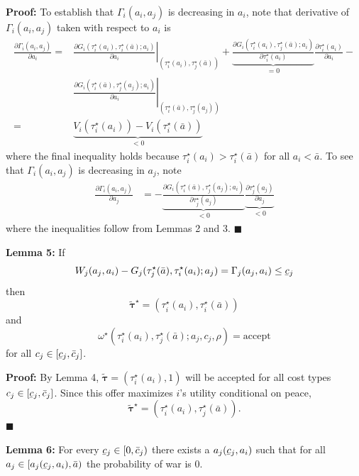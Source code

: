 \documentclass{puthesis}
\DeclareRobustCommand{\ubar}[1]{\underaccent{\bar}{#1}}
\begin{document}
\textbf{Proof: } To establish that \(\Gamma_i(a_i, a_j)\) is decreasing
in \(a_i\), note that derivative of \(\Gamma_i(a_i, a_j)\) taken with
respect to \(a_i\) is \begin{align*}
\frac{\partial \Gamma_i(a_i, a_j)}{\partial a_i} =& \left. \frac{\partial G_i(\tau_i^\star(a_i), \tau_i^\star(\bar{a}); a_i)}{\partial a_i} \right|_{\left( \tau_i^\star(a_i), \tau_j^\star(\bar{a}) \right)} + \underbrace{\frac{\partial G_i(\tau_i^\star(a_i), \tau_j^\star(\bar{a}); a_i)}{\partial \tau_i^\star(a_i)}}_{=0} \frac{\partial \tau_i^\star(a_i)}{\partial a_i} - \\
& \left. \frac{\partial G_i(\tau_i^\star(\bar{a}), \tau_j^\star(a_j); a_i)}{\partial a_i} \right|_{\left( \tau_i^\star(\bar{a}), \tau_j^\star(a_j) \right)} \\
=& \underbrace{V_i(\tau_i^\star(a_i)) - V_i(\tau_i^\star(\bar{a}))}_{<0}
\end{align*} where the final inequality holds because
\(\tau_i^\star(a_i) > \tau_i^\star(\bar{a})\) for all \(a_i < \bar{a}\).
To see that \(\Gamma_i(a_i, a_j)\) is decreasing in \(a_j\), note
\begin{align*}
\frac{\partial \Gamma_i(a_i, a_j)}{\partial a_j} &= - \underbrace{\frac{\partial G_i(\tau_i^\star(\bar{a}), \tau_j^\star(a_j); a_i)}{\partial \tau_j^\star(a_j)}}_{<0} \underbrace{\frac{\partial \tau_j^\star(a_j)}{\partial a_j}}_{<0}
\end{align*} where the inequalities follow from Lemmas 2 and 3.
\(\blacksquare\)

\textbf{Lemma 5:} If \[
W_j(a_j, a_i) - G_j(\tau_j^\star(\bar{a}), \tau_i^\star(a_i); a_j) = \Gamma_j(a_j, a_i) \leq \ubar{c}_j
\] then \[
\tilde{\bm{\tau}}^\star = \left( \tau_i^\star(a_i), \tau_i^\star(\bar{a}) \right)
\] and \[
\omega^\star(\tau_i^\star(a_i), \tau_j^\star(\bar{a}); a_j, c_j, \rho) = \text{accept}
\] for all \(c_j \in [\ubar{c}_j, \bar{c}_j]\).

\textbf{Proof:} By Lemma 4,
\(\tilde{\bm{\tau}} = \left( \tau_i^\star(a_i), 1 \right)\) will be
accepted for all cost types
\(c_j \in \left[ \ubar{c}_j, \bar{c}_j \right]\). Since this offer
maximizes \(i\)'s utility conditional on peace, \[
\tilde{\bm{\tau}}^\star = \left( \tau_i^\star(a_i), \tau_j^\star(\bar{a}) \right) .
\] \(\blacksquare\)

\textbf{Lemma 6:} For every \(\ubar{c}_j \in [ 0, \bar{c}_j )\) there
exists a \(a_j(\ubar{c}_j, a_i)\) such that for all
\(a_j \in [ a_j(\ubar{c}_j, a_i), \bar{a} )\) the probability of war is
0.
\end{document}
